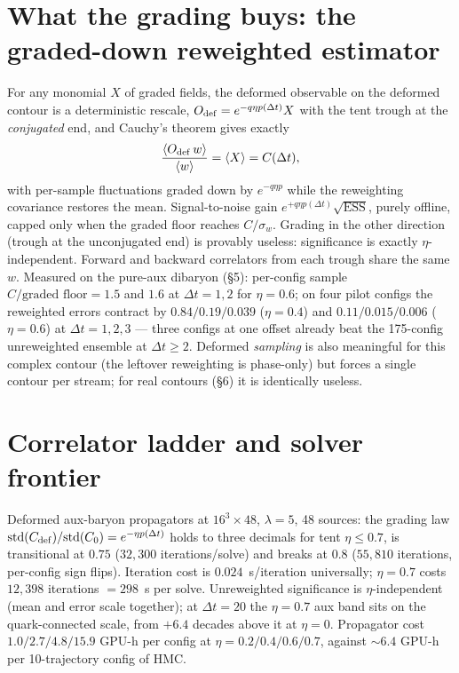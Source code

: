 \documentclass[11pt]{article}
\begin{document}
\section{What the grading buys: the graded-down reweighted estimator}
For any monomial $X$ of graded fields, the deformed observable on the deformed contour is a
deterministic rescale, $O_{\rm def}=e^{-q\eta p(\Delta t)}X$ with the tent trough at the
\emph{conjugated} end, and Cauchy's theorem gives exactly
\begin{equation}
  \frac{\langle O_{\rm def}\,w\rangle}{\langle w\rangle}=\langle X\rangle=C(\Delta t),
\end{equation}
with per-sample fluctuations graded down by $e^{-q\eta p}$ while the reweighting covariance
restores the mean.  Signal-to-noise gain $e^{+q\eta p(\Delta t)}\sqrt{\mathrm{ESS}}$, purely
offline, capped only when the graded floor reaches $C/\sigma_w$.  Grading in the other
direction (trough at the unconjugated end) is provably useless: significance is exactly
$\eta$-independent.  Forward and backward correlators from each trough share the same $w$.
Measured on the pure-aux dibaryon (\S5): per-config sample $C/\text{graded floor}=1.5$ and
$1.6$ at $\Delta t=1,2$ for $\eta=0.6$; on four pilot configs the reweighted errors contract
by $0.84/0.19/0.039$ ($\eta=0.4$) and $0.11/0.015/0.006$ ($\eta=0.6$) at $\Delta t=1,2,3$
--- three configs at one offset already beat the 175-config unreweighted ensemble at
$\Delta t\ge2$.  Deformed \emph{sampling} is also meaningful for this complex contour (the
leftover reweighting is phase-only) but forces a single contour per stream; for real contours
(\S6) it is identically useless.

\section{Correlator ladder and solver frontier}
Deformed aux-baryon propagators at $16^3\times48$, $\lambda=5$, 48 sources: the grading law
$\mathrm{std}(C_{\rm def})/\mathrm{std}(C_0)=e^{-\eta p(\Delta t)}$ holds to three decimals for
tent $\eta\le0.7$, is transitional at $0.75$ ($32{,}300$ iterations/solve) and breaks at $0.8$
($55{,}810$ iterations, per-config sign flips).  Iteration cost is $0.024$~s/iteration
universally; $\eta=0.7$ costs $12{,}398$ iterations $=298$~s per solve.  Unreweighted
significance is $\eta$-independent (mean and error scale together); at $\Delta t=20$ the
$\eta=0.7$ aux band sits on the quark-connected scale, from $+6.4$ decades above it at
$\eta=0$.  Propagator cost $1.0/2.7/4.8/15.9$ GPU-h per config at $\eta=0.2/0.4/0.6/0.7$,
against $\sim6.4$ GPU-h per 10-trajectory config of HMC.
\end{document}
